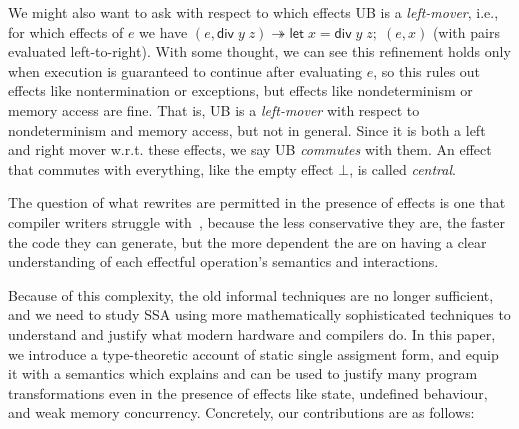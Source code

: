\documentclass[acmsmall,screen,anonymous,review]{acmart}
\newcommand{\ms}[1]{\ensuremath{\mathsf{#1}}}
\newcommand{\letexpr}[3]{\ensuremath{\ms{let}\;#1 = #2;\;#3}}
\newcommand{\tref}{\twoheadrightarrow}
\begin{document}
We might also want to ask with respect to which effects UB is a \emph{left-mover}, i.e., for which
effects of $e$ we have $(e, \ms{div}\;y\;z) \tref \letexpr{x}{\ms{div}\;y\;z}{(e, x)}$ (with pairs
evaluated left-to-right). With some thought, we can see this refinement holds only when execution is
guaranteed to continue after evaluating $e$, so this rules out effects like nontermination or
exceptions, but effects like nondeterminism or memory access are fine. That is, UB is a
\emph{left-mover} with respect to nondeterminism and memory access, but not in general. Since it is
both a left and right mover w.r.t. these effects, we say UB \emph{commutes} with them. An effect
that commutes with everything, like the empty effect $\bot$, is called \emph{central}.





The question of what rewrites are permitted in the presence of effects is one that compiler
writers struggle with~\cite{llvm-github}, because the less conservative they are, the faster
the code they can generate, but the more dependent the are on having a clear understanding of each
effectful operation's semantics and interactions. 

Because of this complexity, the old informal techniques are no longer sufficient, and we need to
study SSA using more mathematically sophisticated techniques to understand and justify what modern
hardware and compilers do. In this paper, we introduce a type-theoretic account of static single
assigment form, and equip it with a semantics which explains and can be used to justify many program
transformations even in the presence of effects like state, undefined behaviour, and weak memory concurrency. Concretely, our contributions are as follows:
\end{document}
